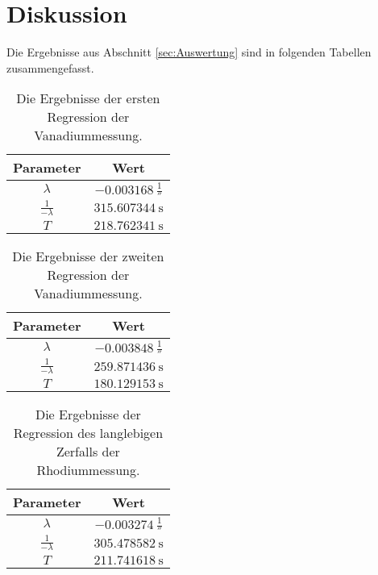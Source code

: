 \section{Diskussion}
\label{sec:Diskussion}
  Die Ergebnisse aus Abschnitt \ref{sec:Auswertung} sind in folgenden Tabellen zusammengefasst.
  \begin{table}[H]
    \centering
    \caption{Die Ergebnisse der ersten Regression der Vanadiummessung.}
    \label{tab:ergebnisse1}
    \begin{tabular}
      {S S}
      \toprule
      {Parameter} & {Wert} \\
      \midrule
      $\lambda$            & $\SI{-0.003168}{\frac{1}{\second}}$ \\
      $\frac{1}{-\lambda}$ & $\SI{315.607344}{\second}$ \\
      $T$                 & $\SI{218.762341}{\second}$ \\
      \bottomrule
    \end{tabular}
  \end{table}
  \begin{table}[H]
    \centering
    \caption{Die Ergebnisse der zweiten Regression der Vanadiummessung.}
    \label{tab:ergebnisse2}
    \begin{tabular}
      {S S}
      \toprule
      {Parameter} & {Wert} \\
      \midrule
      $\lambda$            & $\SI{-0.003848}{\frac{1}{\second}}$ \\
      $\frac{1}{-\lambda}$ & $\SI{259.871436}{\second}$ \\
      $T$                 & $\SI{180.129153}{\second}$ \\
      \bottomrule
    \end{tabular}
  \end{table}
  \begin{table}[H]
    \centering
    \caption{Die Ergebnisse der Regression des langlebigen Zerfalls der Rhodiummessung.}
    \label{tab:ergebnisse3}
    \begin{tabular}
      {S S}
      \toprule
      {Parameter} & {Wert} \\
      \midrule
      $\lambda$            & $\SI{ -0.003274}{\frac{1}{\second}}$ \\
      $\frac{1}{-\lambda}$ & $\SI{305.478582}{\second}$ \\
      $T$                 & $\SI{211.741618}{\second}$ \\
      \bottomrule
    \end{tabular}
  \end{table}
